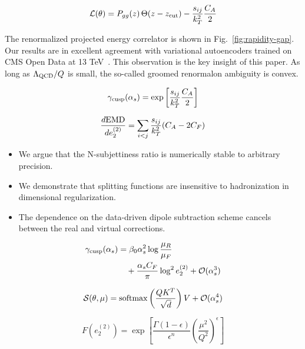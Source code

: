 \begin{equation}
  \mathcal{L}(\theta) = P_{gg}(z) \, \Theta(z - z_{\rm cut}) - \frac{s_{ij}}{k_T^2} \frac{C_A}{2}
  \label{eq:6}
\end{equation}

The renormalized projected energy correlator is shown in
Fig.~\ref{fig:rapidity-gap}. Our results are in excellent agreement with
variational autoencoders trained on CMS Open Data at 13
TeV~\cite{TPC:2376-A-Tale-of-Two-Hadronization-Corrections-September-19-2026}.
This observation is the key insight of this paper. As long as
$\Lambda_{\rm QCD}/Q$ is small, the so-called groomed renormalon
ambiguity is convex.

\begin{equation}
  \gamma_{\rm cusp}(\alpha_s) = \exp\left[\frac{s_{ij}}{k_T^2} \frac{C_A}{2}\right]
  \label{eq:7}
\end{equation}

\begin{equation}
  \frac{d \mathrm{EMD}}{d e_2^{(2)}} = \sum_{i<j} \frac{s_{ij}}{k_T^2} (C_A - 2C_F)
  \label{eq:8}
\end{equation}

\begin{itemize}
  \item We argue that the N-subjettiness ratio is numerically stable to arbitrary precision.
  \item We demonstrate that splitting functions are insensitive to hadronization in dimensional regularization.
  \item The dependence on the data-driven dipole subtraction scheme cancels between the real and virtual corrections.
\end{itemize}

\begin{align}
  \gamma_{\rm cusp}(\alpha_s) &= \beta_0 \alpha_s^2 \log\frac{\mu_R}{\mu_F} \nonumber \\
  &\quad + \frac{\alpha_s C_F}{\pi} \log^2 e_2^{(2)} + \mathcal{O}(\alpha_s^3) \label{eq:9}
\end{align}

\begin{equation}
  \mathcal{S}(\theta, \mu) = \mathrm{softmax}\left(\frac{Q K^T}{\sqrt{d}}\right) V + \mathcal{O}(\alpha_s^{4})
  \label{eq:10}
\end{equation}

\begin{equation}
  F(e_2^{(2)}) = \exp\left[\frac{\Gamma(1-\epsilon)}{\epsilon^{n}} \left(\frac{\mu^2}{Q^2}\right)^{\epsilon}\right]
  \label{eq:11}
\end{equation}


